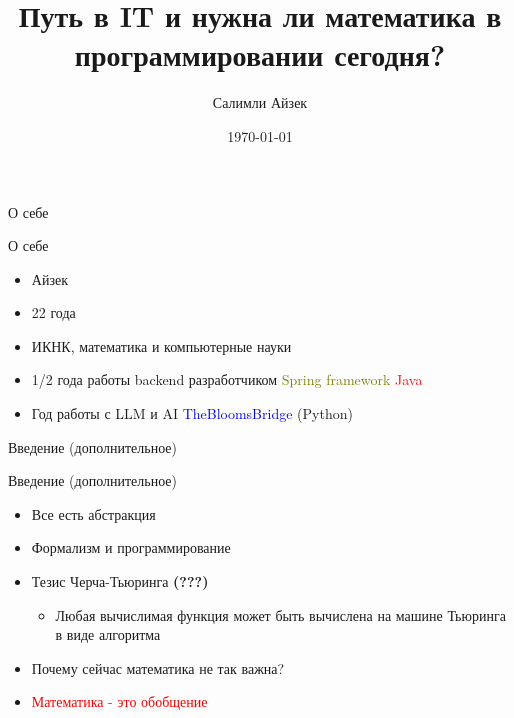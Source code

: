 \documentclass{beamer}
\title[Философия программирования]{Путь в IT и нужна ли математика в программировании сегодня?}
\author{Салимли Айзек}
\institute{MathLang}
\date{\today}
\begin{document}
\begin{frame}
    \titlepage
\end{frame}



\begin{section}{О себе}
    \begin{frame}{О себе}
        \begin{itemize}
            \item Айзек
            \item 22 года
            \item ИКНК, математика и компьютерные науки
            \item 1/2 года работы backend разработчиком \textcolor{olive}{Spring framework} \textcolor{red}{Java}
            \item Год работы с LLM и AI \textcolor{blue}{TheBloomsBridge} (Python)
            
        \end{itemize}
    \end{frame}
\end{section}

\begin{section}{Введение (дополнительное)}
    \begin{frame}{Введение (дополнительное)}
        \begin{itemize}
            \item Все есть абстракция 
            \item Формализм и программирование 
            \item Тезис Черча-Тьюринга \textbf{(???)} 
                \begin{itemize}
                    \item Любая вычислимая функция может быть вычислена на машине Тьюринга в виде алгоритма
                \end{itemize}
            \item Почему сейчас математика не так важна?
            \item \textcolor{red}{Математика - это обобщение}
        \end{itemize}
    \end{frame}
\end{section}
\end{document}
